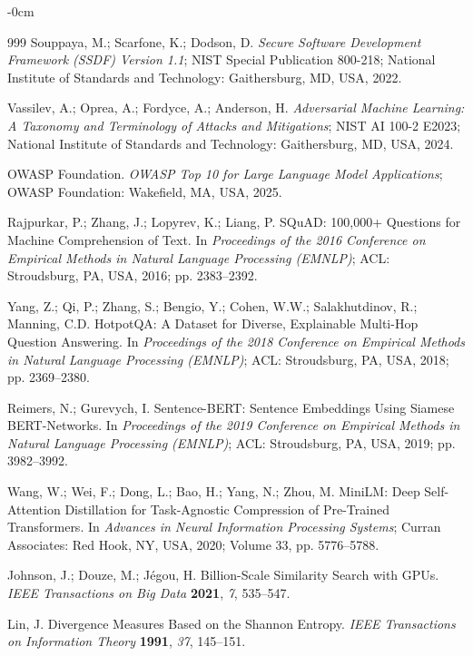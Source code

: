 \documentclass[information,article,submit,moreauthors]{Definitions/mdpi}
\begin{document}
\begin{adjustwidth}{-\extralength}{0cm}
\begin{thebibliography}{999}
Souppaya, M.; Scarfone, K.; Dodson, D. \textit{Secure Software Development Framework (SSDF)
Version 1.1}; NIST Special Publication 800-218; National Institute of Standards and Technology:
Gaithersburg, MD, USA, 2022.

Vassilev, A.; Oprea, A.; Fordyce, A.; Anderson, H. \textit{Adversarial Machine Learning: A
Taxonomy and Terminology of Attacks and Mitigations}; NIST AI 100-2 E2023; National Institute
of Standards and Technology: Gaithersburg, MD, USA, 2024.

OWASP Foundation. \textit{OWASP Top 10 for Large Language Model Applications}; OWASP
Foundation: Wakefield, MA, USA, 2025.


Rajpurkar, P.; Zhang, J.; Lopyrev, K.; Liang, P. SQuAD: 100,000+ Questions for Machine
Comprehension of Text. In \textit{Proceedings of the 2016 Conference on Empirical Methods in
Natural Language Processing (EMNLP)}; ACL: Stroudsburg, PA, USA, 2016; pp. 2383--2392.

Yang, Z.; Qi, P.; Zhang, S.; Bengio, Y.; Cohen, W.W.; Salakhutdinov, R.; Manning, C.D. HotpotQA:
A Dataset for Diverse, Explainable Multi-Hop Question Answering. In \textit{Proceedings of the
2018 Conference on Empirical Methods in Natural Language Processing (EMNLP)}; ACL: Stroudsburg,
PA, USA, 2018; pp. 2369--2380.

Reimers, N.; Gurevych, I. Sentence-BERT: Sentence Embeddings Using Siamese BERT-Networks. In
\textit{Proceedings of the 2019 Conference on Empirical Methods in Natural Language Processing
(EMNLP)}; ACL: Stroudsburg, PA, USA, 2019; pp. 3982--3992.

Wang, W.; Wei, F.; Dong, L.; Bao, H.; Yang, N.; Zhou, M. MiniLM: Deep Self-Attention
Distillation for Task-Agnostic Compression of Pre-Trained Transformers. In \textit{Advances in
Neural Information Processing Systems}; Curran Associates: Red Hook, NY, USA, 2020; Volume 33,
pp. 5776--5788.

Johnson, J.; Douze, M.; J\'egou, H. Billion-Scale Similarity Search with GPUs. \textit{IEEE
Transactions on Big Data} \textbf{2021}, \textit{7}, 535--547.

Lin, J. Divergence Measures Based on the Shannon Entropy. \textit{IEEE Transactions on
Information Theory} \textbf{1991}, \textit{37}, 145--151.


\end{thebibliography}
\end{adjustwidth}
\end{document}
